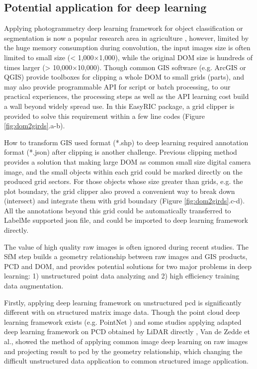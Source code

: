 \documentclass[doublespacing]{configs/bmcart}
\begin{document}
\subsection*{Potential application for deep learning}
Applying photogrammetry deep learning framework for object classification or segmentation is now a popular research area in agriculture \cite{zhou_fast_2020, feng_evaluation_2020, desai_automatic_2019}, however, limited by the huge memory consumption during convolution, the input images size is often limited to small size (< 1,000$\times$1,000), while the original DOM size is hundreds of times larger (> 10,000$\times$10,000). Though common GIS software (e.g. ArcGIS or QGIS) provide toolboxes for clipping a whole DOM to small grids (parts), and may also provide programmable API for script or batch processing, to our practical experiences, the processing steps as well as the API learning cost build a wall beyond widely spread use. In this EasyRIC package, a grid clipper is provided to solve this requirement within a few line codes (Figure \ref{fig:dom2girds}.a-b).

How to transform GIS used format (*.shp) to deep learning required annotation format (*.json) after clipping is another challenge. Previous clipping method provides a solution that making large DOM as common small size digital camera image, and the small objects within each grid could be marked directly on the produced grid sectors. For those objects whose size greater than grids, e.g. the plot boundary, the grid clipper also proved a convenient way to break down (intersect) and integrate them with grid boundary (Figure \ref{fig:dom2girds}.c-d). All the annotations beyond this grid could be automatically transferred to LabelMe supported json file, and could be imported to deep learning framework directly.

The value of high quality raw images is often ignored during recent studies. The SfM step builds a geometry relationship between raw images and GIS products, PCD and DOM, and provides potential solutions for two major problems in deep learning: 1) unstructured point data analyzing and 2) high efficiency training data augmentation.

Firstly, applying deep learning framework on unstructured \acrshort*{pcd} is significantly different with on structured matrix image data. Though the point cloud deep learning framework exists (e.g. PointNet \cite{qi_pointnet_2017}) and some studies applying adapted deep learning framework on PCD obtained by LiDAR directly \cite{jin_deep_2018, jin_stemleaf_2019, jin_non-destructive_2020}, Van de Zedde et al., \cite{van_plant-part_2019} showed the method of applying common image deep learning on raw images and projecting result to \acrshort*{pcd} by the geometry relationship, which changing the difficult unstructured data application to common structured image application.
\end{document}
